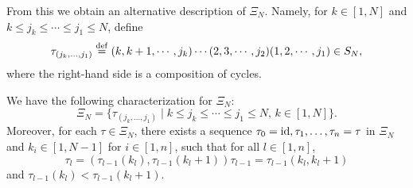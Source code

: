 From this we obtain an alternative description of $\Xi_N$. Namely, for $k\in [1, N]$
and $k \leq j_k \leq \cdots \leq j_1 \leq N$, define
\begin{equation*}
	\tau_{(j_k, \dots, j_1)} \overset{\mathrm{def}}{=} (k,k+1, \cdots, j_k)\cdots (2,3, \cdots, j_2)(1,2,\cdots, j_1)\in S_N,
\end{equation*}
%
where the right-hand side is a composition of cycles.
\begin{lemma}\label{lem:xi_n_characterization}

	We have the following characterization for $\Xi_N$:
	\begin{equation*}
		\Xi_N = \{\tau_{(j_k, \dots, j_1)} \mid k \leq j_k \leq \cdots \leq j_1 \leq N,\, k\in [1, N]\}.
	\end{equation*}
	Moreover, for each $\tau \in \Xi_N$, there exists a sequence $\tau_0 = \operatorname{id}, \tau_1,
		\dots, \tau_n = \tau$ in $\Xi_N$ and $k_i\in[1, N-1]$ for $i\in[1,n]$, such that for
	all $l \in [1, n]$,
	\begin{equation*}
		\tau_l = (\tau_{l-1}(k_l), \tau_{l-1}(k_l + 1))\tau_{l-1} = \tau_{l-1}(k_l, k_l + 1)
	\end{equation*}
	and $\tau_{l-1}(k_l) < \tau_{l-1}(k_l + 1)$.
\end{lemma}
